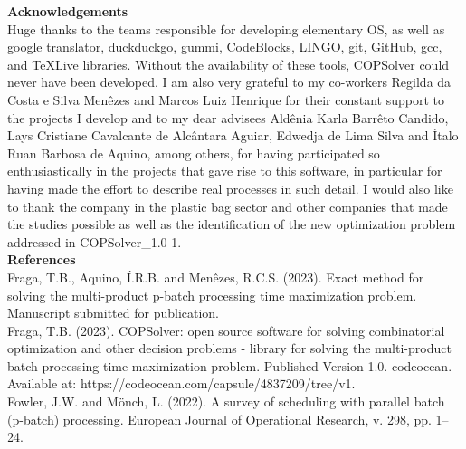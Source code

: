 \documentclass[11pt, letterpaper]{article}
\begin{document}
\vskip0.3cm
\noindent
\textbf{Acknowledgements}\\
Huge thanks to the teams responsible for developing elementary OS, as well as google translator, duckduckgo, gummi, CodeBlocks, LINGO, git, GitHub, gcc, and TeXLive libraries. Without the availability of these tools, COPSolver could never have been developed. I am also very grateful to my co-workers Regilda da Costa e Silva Menêzes and Marcos Luiz Henrique for their constant support to the projects I develop and to my dear advisees Aldênia Karla Barrêto Candido, Lays Cristiane Cavalcante de Alcântara Aguiar, Edwedja de Lima Silva and Ítalo Ruan Barbosa de Aquino, among others, for having participated so enthusiastically in the projects that gave rise to this software, in particular for having made the effort to describe real processes in such detail. I would also like to thank the company in the plastic bag sector and other companies that made the studies possible as well as the identification of the new optimization problem addressed in COPSolver\_1.0-1. \\

\noindent
\textbf{References}\\

Fraga, T.B., Aquino, Í.R.B. and Menêzes, R.C.S. (2023). Exact method for solving the multi-product p-batch processing time maximization problem. Manuscript submitted for publication.  \\

Fraga, T.B. (2023). COPSolver: open source software for solving combinatorial optimization and other decision problems - library for solving the multi-product batch processing time maximization problem. Published Version 1.0. codeocean. Available at: https://codeocean.com/capsule/4837209/tree/v1.  \\

Fowler, J.W. and Mönch, L. (2022). A survey of scheduling with parallel batch (p-batch) processing. European Journal of Operational Research, v. 298, pp. 1–24. \\


\vskip 1.5cm
\end{document}
